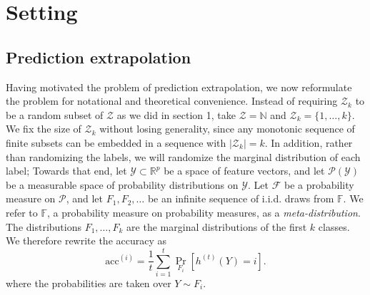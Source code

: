 \documentclass{article}
\begin{document}
\section{Setting}

\subsection{Prediction extrapolation}

Having motivated the problem of prediction extrapolation,
we now reformulate the problem for notational and theoretical convenience.
Instead of requiring $\mathcal{Z}_k$ to be a random subset of $\mathcal{Z}$ as we did in section 1, take
$\mathcal{Z}=\mathbb{N}$ and $\mathcal{Z}_k = \{1,\hdots, k\}$.
We fix the size of $\mathcal{Z}_k$ without losing generality, since any monotonic sequence of 
finite subsets can be embedded in a sequence with $|\mathcal{Z}_k| = k$.
In addition, rather than randomizing the labels, we will randomize the marginal distribution of each label;
Towards that end, let $\mathcal{Y} \subset \mathbb{R}^p$ be a space of feature vectors, and
let $\mathcal{P}(\mathcal{Y})$ be a measurable space of probability distributions on $\mathcal{Y}$.
Let $\mathcal{F}$ be a probability measure on $\mathcal{P}$,
and let $F_1, F_2,\hdots$ be an infinite sequence of i.i.d. draws from $\mathbb{F}$.
We refer to $\mathbb{F}$, a probability measure on probability measures, as a \emph{meta-distribution}.
The distributions $F_1,\hdots, F_k$ are the marginal distributions of the first $k$ classes.
We therefore rewrite the accuracy as
\[
\text{acc}^{(i)} = \frac{1}{t}\sum_{i=1}^t \Pr_{F_i}[h^{(t)}(Y) = i].
\]
where the probabilities are taken over $Y \sim F_i$.
\end{document}

